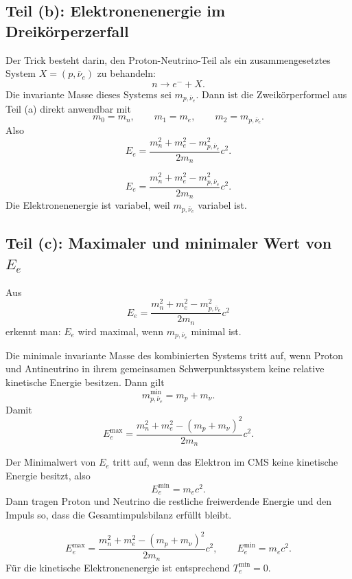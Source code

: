 \documentclass[11pt,a4paper]{scrartcl}
\theoremstyle{definition}
\theoremstyle{plain}
\theoremstyle{remark}
\begin{document}
\subsection{Teil (b): Elektronenenergie im Dreikörperzerfall}

\begin{calculationbox}
Der Trick besteht darin, den Proton-Neutrino-Teil als ein zusammengesetztes System $X=(p,\bar\nu_e)$ zu behandeln:
\[
    n\longrightarrow e^-+X.
\]
Die invariante Masse dieses Systems sei $m_{p,\bar\nu_e}$. Dann ist die Zweikörperformel aus Teil (a) direkt anwendbar mit
\[
    m_0=m_n,\qquad m_1=m_e,\qquad m_2=m_{p,\bar\nu_e}.
\]
Also
\[
    E_e=\frac{m_n^2+m_e^2-m_{p,\bar\nu_e}^2}{2m_n}c^2.
\]
\end{calculationbox}

\begin{answerbox}
\[
    \boxed{E_e=\frac{m_n^2+m_e^2-m_{p,\bar\nu_e}^2}{2m_n}c^2.}
\]
Die Elektronenenergie ist variabel, weil $m_{p,\bar\nu_e}$ variabel ist.
\end{answerbox}

\subsection{Teil (c): Maximaler und minimaler Wert von $E_e$}

\begin{calculationbox}
Aus
\[
    E_e=\frac{m_n^2+m_e^2-m_{p,\bar\nu_e}^2}{2m_n}c^2
\]
erkennt man: $E_e$ wird maximal, wenn $m_{p,\bar\nu_e}$ minimal ist.

Die minimale invariante Masse des kombinierten Systems tritt auf, wenn Proton und Antineutrino in ihrem gemeinsamen Schwerpunktssystem keine relative kinetische Energie besitzen. Dann gilt
\[
    m_{p,\bar\nu_e}^{\min}=m_p+m_\nu.
\]
Damit
\[
    E_e^{\max}=\frac{m_n^2+m_e^2-(m_p+m_\nu)^2}{2m_n}c^2.
\]

Der Minimalwert von $E_e$ tritt auf, wenn das Elektron im CMS keine kinetische Energie besitzt, also
\[
    E_e^{\min}=m_ec^2.
\]
Dann tragen Proton und Neutrino die restliche freiwerdende Energie und den Impuls so, dass die Gesamtimpulsbilanz erfüllt bleibt.
\end{calculationbox}

\begin{answerbox}
\[
    \boxed{E_e^{\max}=\frac{m_n^2+m_e^2-(m_p+m_\nu)^2}{2m_n}c^2,
    \qquad
    E_e^{\min}=m_ec^2.}
\]
Für die kinetische Elektronenenergie ist entsprechend $T_e^{\min}=0$.
\end{answerbox}
\end{document}
